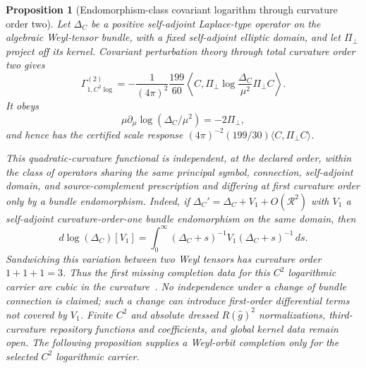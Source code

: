 \documentclass[11pt]{article}
\newtheorem{proposition}[theorem]{Proposition}
\theoremstyle{definition}
\theoremstyle{remark}
\begin{document}
\begin{proposition}[Endomorphism-class covariant logarithm through curvature order two]
Let $\Delta_C$ be a positive self-adjoint Laplace-type operator on the
algebraic Weyl-tensor bundle, with a fixed self-adjoint elliptic domain, and
let $\Pi_\perp$ project off its kernel.  Covariant perturbation theory through
total curvature order two gives
\[
 \Gamma_{1,C^2\log}^{(2)}
 =-\frac1{(4\pi)^2}\frac{199}{60}
 \left\langle C,\Pi_\perp
 \log\frac{\Delta_C}{\mu^2}\Pi_\perp C\right\rangle .
\]
It obeys
\[
 \mu\partial_\mu\log(\Delta_C/\mu^2)=-2\Pi_\perp,
\]
and hence has the certified scale response
$(4\pi)^{-2}(199/30)\langle C,\Pi_\perp C\rangle$.

This quadratic-curvature functional is independent, at the declared order,
within the class of operators sharing the same principal symbol, connection,
self-adjoint domain, and source-complement prescription and differing at first
curvature order only by a bundle endomorphism.  Indeed, if
$\Delta_C'=\Delta_C+V_1+O(\mathcal R^2)$ with $V_1$ a self-adjoint
curvature-order-one bundle endomorphism on the same domain, then
\[
 d\log(\Delta_C)[V_1]
 =\int_0^\infty(\Delta_C+s)^{-1}V_1
 (\Delta_C+s)^{-1}\,ds.
\]
Sandwiching this variation between two Weyl tensors has curvature order
$1+1+1=3$.  Thus the first missing completion data for this $C^2$ logarithmic
carrier are cubic in the curvature~\cite{BarvinskyCPT,DonoghueElMenoufi}.
No independence under a change of bundle connection is claimed; such a change
can introduce first-order differential terms not covered by $V_1$.
Finite $C^2$ and absolute dressed $R(\widehat g)^2$ normalizations,
third-curvature repository functions and coefficients, and global kernel data remain open.  The
following proposition supplies a Weyl-orbit
completion only for the selected $C^2$ logarithmic carrier.
\end{proposition}
\end{document}
